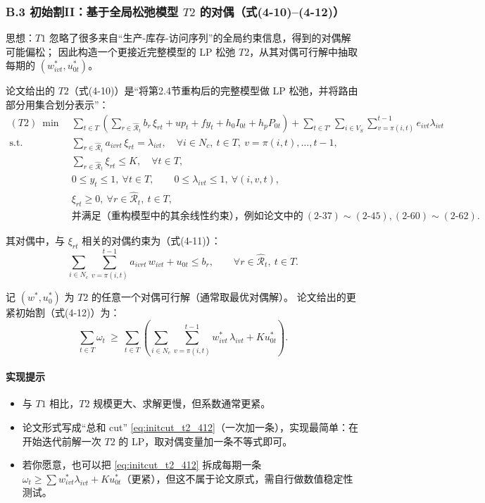 \documentclass{article}
\begin{document}
\subsubsection*{B.3 初始割II：基于全局松弛模型 $T2$ 的对偶（式(4-10)--(4-12)）}

思想：$T1$ 忽略了很多来自“生产-库存-访问序列”的全局约束信息，得到的对偶解可能偏松；
因此构造一个更接近完整模型的 LP 松弛 $T2$，从其对偶可行解中抽取每期的 $(w^*_{ivt},u^*_{0t})$。

论文给出的 $T2$（式(4-10)）是“将第2.4节重构后的完整模型做 LP 松弛，并将路由部分用集合划分表示”：
\begin{equation}
\begin{aligned}
(T2)\ \min\ &\sum_{t\in T}\left(\sum_{r\in\hat{\mathcal R}_t} b_r\,\xi_{rt} + u p_t + f y_t + h_0 I_{0t}+h_p P_{0t}\right)
+\sum_{t\in T'}\sum_{i\in V_S}\sum_{v=\pi(i,t)}^{t-1} e_{ivt}\lambda_{ivt}\\
\text{s.t.}\ &\sum_{r\in\hat{\mathcal R}_t} a_{ivrt}\,\xi_{rt}=\lambda_{ivt},\quad \forall i\in N_c,\ t\in T,\ v=\pi(i,t),\dots,t-1,\\
&\sum_{r\in\hat{\mathcal R}_t}\xi_{rt}\le K,\quad \forall t\in T,\\
&0\le y_t\le 1,\ \forall t\in T,\qquad 0\le \lambda_{ivt}\le 1,\ \forall(i,v,t),\\
&\xi_{rt}\ge 0,\ \forall r\in\hat{\mathcal R}_t,\ t\in T,\\
&\text{并满足（重构模型中的其余线性约束），例如论文中的}\ (2\text{-}37)\sim(2\text{-}45),(2\text{-}60)\sim(2\text{-}62).
\end{aligned}
\label{eq:t2_lp_410}
\end{equation}

其对偶中，与 $\xi_{rt}$ 相关的对偶约束为（式(4-11)）：
\begin{equation}
\sum_{i\in N_c}\sum_{v=\pi(i,t)}^{t-1} a_{ivrt}\,w_{ivt}+u_{0t}\le b_r,\qquad \forall r\in\hat{\mathcal R}_t,\ t\in T.
\label{eq:t2_dual_constr_411}
\end{equation}

记 $(w^*,u_0^*)$ 为 $T2$ 的任意一个对偶可行解（通常取最优对偶解）。
论文给出的更紧初始割（式(4-12)）为：
\begin{equation}
\sum_{t\in T}\omega_t\ \ge\ \sum_{t\in T}\left(\sum_{i\in N_c}\sum_{v=\pi(i,t)}^{t-1} w_{ivt}^*\,\lambda_{ivt} + K u_{0t}^*\right).
\label{eq:initcut_t2_412}
\end{equation}

\paragraph{实现提示}
\begin{itemize}[leftmargin=2em]
  \item 与 $T1$ 相比，$T2$ 规模更大、求解更慢，但系数通常更紧。
  \item 论文形式写成“总和 cut” \eqref{eq:initcut_t2_412}（一次加一条），实现最简单：在开始迭代前解一次 $T2$ 的 LP，取对偶变量加一条不等式即可。
  \item 若你愿意，也可以把 \eqref{eq:initcut_t2_412} 拆成每期一条 $\omega_t\ge \sum w^*_{ivt}\lambda_{ivt}+K u^*_{0t}$（更紧），但这不属于论文原式，需自行做数值稳定性测试。
\end{itemize}
\end{document}

